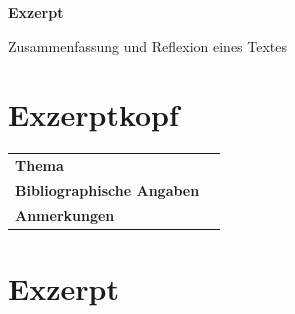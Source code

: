 \documentclass[11pt,a4paper]{article}
\begin{document}

\begin{center}

    {\LARGE\bfseries Exzerpt}

    \vspace{0.3cm}

    {\large Zusammenfassung und Reflexion eines Textes}

\end{center}

\vspace{0.8cm}


\section*{Exzerptkopf}

\renewcommand{\arraystretch}{1.5}

\begin{tabular}{@{}p{5cm}p{21cm}@{}}

\textbf{Thema}
&
\\[0.5cm]

\textbf{Bibliographische Angaben}
&
\\[0.5cm]

\textbf{Anmerkungen}
&


\end{tabular}

\vspace{0.5cm}


\section*{Exzerpt}

\small

\renewcommand{\arraystretch}{1.5}

%
%
\end{document}
